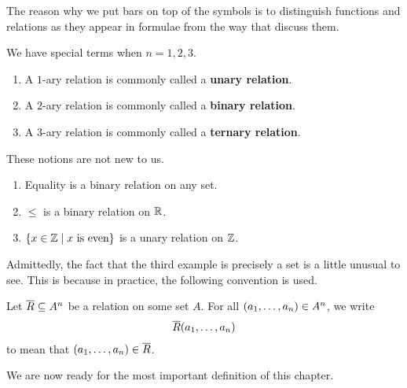 \begin{boxconvention}
    The reason why we put bars on top of the symbols is to distinguish functions and relations as they appear in formulae from the way that discuss them.
\end{boxconvention}

We have special terms when $n = 1, 2, 3$.

\begin{boxconvention}
    \hfill
    \begin{enumerate}
        \item A $1$-ary relation is commonly called a \textbf{unary relation}.
        \item A $2$-ary relation is commonly called a \textbf{binary relation}.
        \item A $3$-ary relation is commonly called a \textbf{ternary relation}.
    \end{enumerate}
\end{boxconvention}

These notions are not new to us.

\begin{boxexample}
    \hfill
    \begin{enumerate}
        \item Equality is a binary relation on any set.
        \item $\leq$ is a binary relation on $\mathbb{R}$.
        \item $\left\{ x \in \mathbb{Z} \; \middle\vert \; x \text{ is even} \right\}$ is a unary relation on $\mathbb{Z}$.
    \end{enumerate}
\end{boxexample}

Admittedly, the fact that the third example is precisely a set is a little unusual to see. This is because in practice, the following convention is used.

\begin{boxconvention}
    Let $\overline{R} \subseteq A^n$ be a relation on some set $A$. For all $\left( a_1, \ldots, a_n \right) \in A^n$, we write
    \begin{align*}
        \overline{R}\!\left( a_1, \ldots, a_n \right)
    \end{align*}
    to mean that $\left( a_1, \ldots, a_n \right) \in \overline{R}$.
\end{boxconvention}

We are now ready for the most important definition of this chapter.


